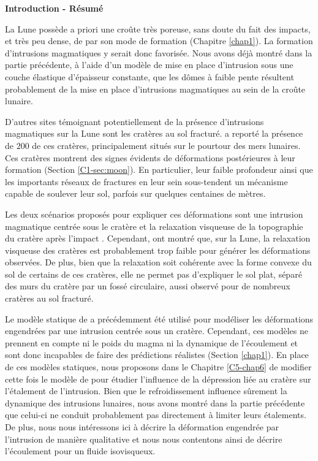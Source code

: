 \thispagestyle{plain}
\begin{flushleft}
 \Large \vspace{.5cm} \textbf{Introduction - Résumé}
\end{flushleft}

La Lune possède a priori une croûte très poreuse, sans doute du fait
des impacts, et très peu dense, de par son mode de formation (Chapitre
\ref{chap1}). La formation d’intrusions magmatiques y serait donc
favorisée. Nous avons déjà montré dans la partie précédente, à l’aide
d’un modèle de mise en place d’intrusion sous une couche élastique
d’épaisseur constante, que les dômes à faible pente résultent
probablement de la mise en place d'intrusions magmatiques au sein de
la croûte lunaire.

D’autres sites témoignant potentiellement de la présence d’intrusions
magmatiques sur la Lune sont les cratères au sol fracturé.
\citet{Schultz:1976kt} a reporté la présence de $200$ de ces cratères,
principalement situés sur le pourtour des mers lunaires. Ces cratères
montrent des signes évidents de déformations postérieures à leur
formation (Section \ref{C1-sec:moon}). En particulier, leur faible
profondeur ainsi que les importants réseaux de fractures en leur sein
sous-tendent un mécanisme capable de soulever leur sol, parfois sur
quelques centaines de mètres. 

Les deux scénarios proposés pour expliquer ces déformations sont une
intrusion magmatique centrée sous le cratère et la relaxation
visqueuse de la topographie du cratère après l’impact
\citep{Wichman:1996bj}. Cependant, \citet{Dombard:2001gs} ont montré
que, sur la Lune, la relaxation visqueuse des cratères est
probablement trop faible pour générer les déformations observées. De
plus, bien que la relaxation soit cohérente avec la forme convexe du
sol de certains de ces cratères, elle ne permet pas d’expliquer le sol
plat, séparé des murs du cratère par un fossé circulaire, aussi
observé pour de nombreux cratères au sol fracturé.

Le modèle statique de \citet{Pollard:1973ho} a précédemment été
utilisé pour modéliser les déformations engendrées par une intrusion
centrée sous un cratère. Cependant, ces modèles ne prennent en compte
ni le poids du magma ni la dynamique de l’écoulement et sont donc
incapables de faire des prédictions réalistes (Section
\ref{chap1}). En place de ces modèles statiques, nous proposons dans
le Chapitre \ref{C5-chap6} de modifier cette fois le modèle de
\citet{Michaut:2011kg} pour étudier l’influence de la dépression liée
au cratère sur l’étalement de l'intrusion. Bien que le
refroidissement influence sûrement la dynamique des intrusions
lunaires, nous avons montré dans la partie précédente que celui-ci ne
conduit probablement pas directement à limiter leurs étalements. De
plus, nous nous intéressons ici à décrire la déformation engendrée par
l’intrusion de manière qualitative et nous nous contentons ainsi de
décrire l’écoulement pour un fluide isovisqueux.

